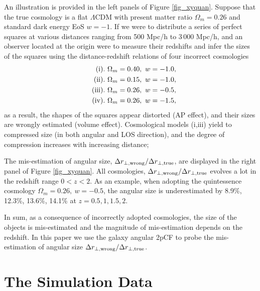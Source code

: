 \documentclass[iop]{emulateapj}
\begin{document}
An illustration is provided in the left panels of Figure \ref{fig_xyquan}.
Suppose that the true cosmology is a flat $\Lambda$CDM with present matter ratio $\Omega_m=0.26$
and standard dark energy EoS $w=-1$.
If we were to distribute a series of perfect squares at various distances ranging from 500 Mpc/h to 3\,000 Mpc/h,
and an observer located at the origin were to measure their redshifts and infer the sizes of the squares
using the distance-redshift relations of four incorrect cosmologies
\begin{eqnarray}
 & &{\rm (i)}.\ \Omega_m=0.40,\ w=-1.0, \nonumber \\ 
 & &{\rm (ii)}.\ \Omega_m=0.15,\ w=-1.0, \nonumber\\ \noindent
 & &{\rm (iii)}.\ \Omega_m=0.26,\ w=-0.5,\nonumber\\ \noindent
 & &{\rm (iv)}.\ \Omega_m=0.26,\ w=-1.5, \nonumber \noindent
\end{eqnarray}
as a result, 
the shapes of the squares appear distorted (AP effect),
and their sizes are wrongly estimated (volume effect).
Cosmological models (i,iii) yield to compressed size (in both angular and LOS direction),
and the degree of compression increases with increasing distance;

The mis-estimation of angular size, ${\Delta r_{\bot, \rm wrong}}/{\Delta r_{\bot, \rm true}}$, 
are displayed in the right panel of Figure \ref{fig_xyquan}.
All cosmologies, ${\Delta r_{\bot, \rm wrong}}/{\Delta r_{\bot, \rm true}}$ evolves a lot in the redshift range $0<z<2$.
As an example, when adopting the quintessence cosmology $\Omega_m=0.26,\ w=-0.5$,
the angular size is underestimated by 
8.9\%, 12.3\%, 13.6\%, 14.1\% 
at $z=0.5,1,1.5,2$.


In sum, as a consequence of incorrectly adopted cosmologies, 
the size of the objects is mis-estimated and the magnitude of mis-estimation depends on the redshift.
In this paper we use the galaxy angular 2pCF to probe the mis-estimation of angular size ${\Delta r_{\bot, \rm wrong}}/{\Delta r_{\bot, \rm true}}$.


\section{The Simulation Data}\label{sec:data}
\end{document}
